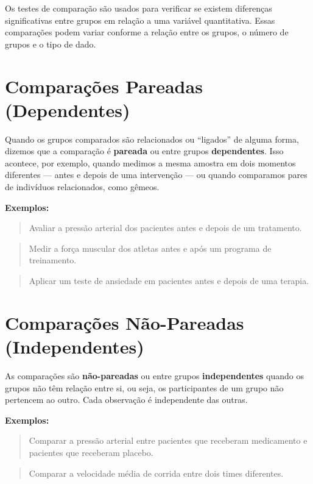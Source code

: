 \documentclass[
]{book}
\begin{document}
Os testes de comparação são usados para verificar se existem diferenças significativas entre grupos em relação a uma variável quantitativa. Essas comparações podem variar conforme a relação entre os grupos, o número de grupos e o tipo de dado.

\section{Comparações Pareadas (Dependentes)}\label{comparauxe7uxf5es-pareadas-dependentes}

Quando os grupos comparados são relacionados ou ``ligados'' de alguma forma, dizemos que a comparação é \textbf{pareada} ou entre grupos \textbf{dependentes}. Isso acontece, por exemplo, quando medimos a mesma amostra em dois momentos diferentes --- antes e depois de uma intervenção --- ou quando comparamos pares de indivíduos relacionados, como gêmeos.

\textbf{Exemplos:}

\begin{quote}
Avaliar a pressão arterial dos pacientes antes e depois de um tratamento.
\end{quote}

\begin{quote}
Medir a força muscular dos atletas antes e após um programa de treinamento.
\end{quote}

\begin{quote}
Aplicar um teste de ansiedade em pacientes antes e depois de uma terapia.
\end{quote}

\section{Comparações Não-Pareadas (Independentes)}\label{comparauxe7uxf5es-nuxe3o-pareadas-independentes}

As comparações são \textbf{não-pareadas} ou entre grupos \textbf{independentes} quando os grupos não têm relação entre si, ou seja, os participantes de um grupo não pertencem ao outro. Cada observação é independente das outras.

\textbf{Exemplos:}

\begin{quote}
Comparar a pressão arterial entre pacientes que receberam medicamento e pacientes que receberam placebo.
\end{quote}

\begin{quote}
Comparar a velocidade média de corrida entre dois times diferentes.
\end{quote}
\end{document}
